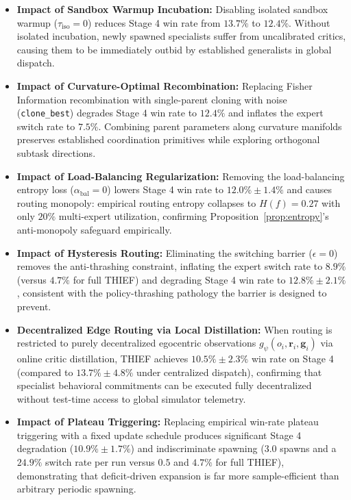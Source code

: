 \begin{itemize}[leftmargin=*,nosep]
    \item \textbf{Impact of Sandbox Warmup Incubation:} Disabling isolated sandbox warmup ($\tau_{\text{iso}}=0$) reduces Stage 4 win rate from $13.7\%$ to $12.4\%$. Without isolated incubation, newly spawned specialists suffer from uncalibrated critics, causing them to be immediately outbid by established generalists in global dispatch.
    \item \textbf{Impact of Curvature-Optimal Recombination:} Replacing Fisher Information recombination with single-parent cloning with noise (\texttt{clone\_best}) degrades Stage 4 win rate to $12.4\%$ and inflates the expert switch rate to $7.5\%$. Combining parent parameters along curvature manifolds preserves established coordination primitives while exploring orthogonal subtask directions.
    \item \textbf{Impact of Load-Balancing Regularization:} Removing the load-balancing entropy loss ($\alpha_{\text{bal}}=0$) lowers Stage 4 win rate to $12.0\% \pm 1.4\%$ and causes routing monopoly: empirical routing entropy collapses to $H(f) = 0.27$ with only $20\%$ multi-expert utilization, confirming Proposition~\ref{prop:entropy}'s anti-monopoly safeguard empirically.
    \item \textbf{Impact of Hysteresis Routing:} Eliminating the switching barrier ($\epsilon=0$) removes the anti-thrashing constraint, inflating the expert switch rate to $8.9\%$ (versus $4.7\%$ for full THIEF) and degrading Stage 4 win rate to $12.8\% \pm 2.1\%$, consistent with the policy-thrashing pathology the barrier is designed to prevent.
    \item \textbf{Decentralized Edge Routing via Local Distillation:} When routing is restricted to purely decentralized egocentric observations $g_\psi(o_i, \mathbf{r}_i, \mathbf{g}_i)$ via online critic distillation, THIEF achieves $10.5\% \pm 2.3\%$ win rate on Stage 4 (compared to $13.7\% \pm 4.8\%$ under centralized dispatch), confirming that specialist behavioral commitments can be executed fully decentralized without test-time access to global simulator telemetry.
    \item \textbf{Impact of Plateau Triggering:} Replacing empirical win-rate plateau triggering with a fixed update schedule produces significant Stage 4 degradation ($10.9\% \pm 1.7\%$) and indiscriminate spawning ($3.0$ spawns and a $24.9\%$ switch rate per run versus $0.5$ and $4.7\%$ for full THIEF), demonstrating that deficit-driven expansion is far more sample-efficient than arbitrary periodic spawning.
\end{itemize}

